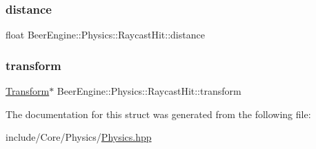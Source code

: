 \subsubsection{\texorpdfstring{distance}{distance}}
{\footnotesize\ttfamily float Beer\+Engine\+::\+Physics\+::\+Raycast\+Hit\+::distance}

\mbox{\label{struct_beer_engine_1_1_physics_1_1_raycast_hit_aaf554d2ee6c3eb56b7af00d5a26ad006}} 
\subsubsection{\texorpdfstring{transform}{transform}}
{\footnotesize\ttfamily \mbox{\hyperlink{class_beer_engine_1_1_transform}{Transform}}$\ast$ Beer\+Engine\+::\+Physics\+::\+Raycast\+Hit\+::transform}



The documentation for this struct was generated from the following file\+:\begin{DoxyCompactItemize}
\item 
include/\+Core/\+Physics/\mbox{\hyperlink{_physics_8hpp}{Physics.\+hpp}}\end{DoxyCompactItemize}
